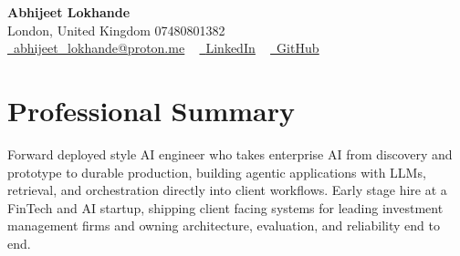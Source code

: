 \documentclass[a4paper,10pt]{article}
\begin{document}
    \begin{center}
        {\Huge\bfseries Abhijeet Lokhande}
        \\[2pt] {\color{muted}London, United Kingdom \textbar{} 07480801382}\\
        \small
        \href{mailto:abhijeet_lokhande@proton.me}{\raisebox{-0.2\height}{\color{primary}\faEnvelope}\  \underline{abhijeet\_lokhande@proton.me}} ~
        \href{https://www.linkedin.com/in/ablds/}{\raisebox{-0.2\height}{\color{primary}\faLinkedin}\ \underline{LinkedIn}}  ~
        \href{https://github.com/abhijeetscode}{\raisebox{-0.2\height}{\color{primary}\faGithub}\ \underline{GitHub}}
    \end{center}

\section{Professional Summary}
\vspace{-5pt}
{\color{muted}Forward deployed style AI engineer who takes enterprise AI from discovery and prototype to durable production, building agentic applications with LLMs, retrieval, and orchestration directly into client workflows. Early stage hire at a FinTech and AI startup, shipping client facing systems for leading investment management firms and owning architecture, evaluation, and reliability end to end.}
\vspace{2pt}

\end{document}
